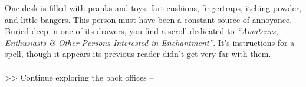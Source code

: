 One desk is filled with pranks and toys: fart cushions, fingertraps, itching powder, and little bangers. This person must have been a constant source of annoyance.\\

Buried deep in one of its drawers, you find a scroll dedicated to \emph{“Amateurs, Enthusiasts \& Other Persons Interested in Enchantment”}. It’s instructions for a spell, though it appears its previous reader didn’t get very far with them.\\
\\

>> Continue exploring the back offices -- 